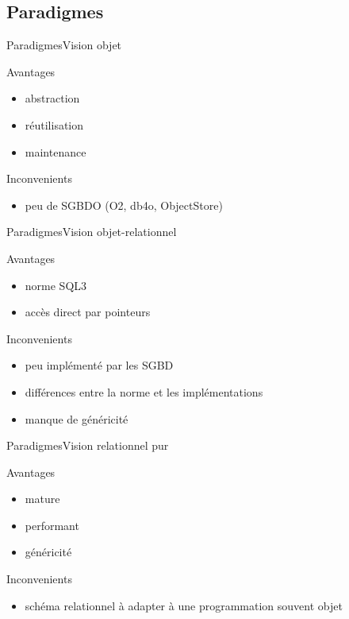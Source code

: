 \subsection{Paradigmes}
\begin{frame}{Paradigmes}{Vision objet}
  \begin{block}{Avantages}
    \begin{itemize}
      \item abstraction
      \item réutilisation
      \item maintenance
    \end{itemize}
  \end{block}
  \begin{block}{Inconvenients}
    \begin{itemize}
      \item peu de SGBDO (O2, db4o, ObjectStore)
    \end{itemize}
  \end{block}
\end{frame}

\begin{frame}{Paradigmes}{Vision objet-relationnel}
  \begin{block}{Avantages}
    \begin{itemize}
      \item norme SQL3
      \item accès direct par pointeurs
    \end{itemize}
  \end{block}
  \begin{block}{Inconvenients}
    \begin{itemize}
      \item peu implémenté par les SGBD
      \item différences entre la norme et les implémentations
      \item manque de généricité
    \end{itemize}
  \end{block}
\end{frame}

\begin{frame}{Paradigmes}{Vision relationnel pur}
  \begin{block}{Avantages}
    \begin{itemize}
      \item mature
      \item performant
      \item généricité
    \end{itemize}
  \end{block}
  \begin{block}{Inconvenients}
    \begin{itemize}
      \item schéma relationnel à adapter à une programmation souvent objet
    \end{itemize}
  \end{block}
\end{frame}

